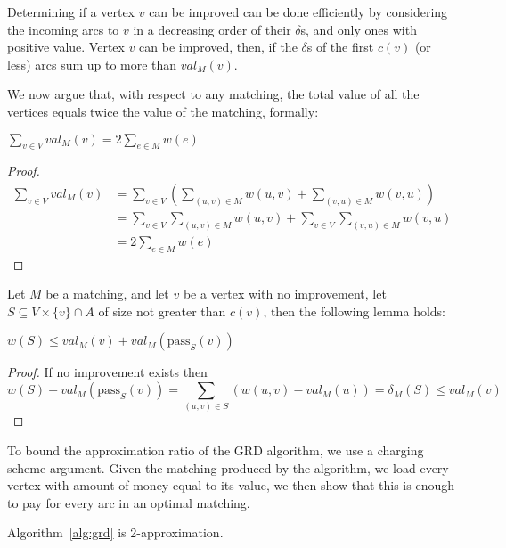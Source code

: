 \begin{remark}
Determining if a vertex $v$ can be improved can be done efficiently
by considering the incoming arcs to $v$ in a decreasing order of their $\delta$s,
and only ones with positive value.
Vertex $v$ can be improved, then, if the $\delta$s of the first $c(v)$ (or less) arcs
sum up to more than $val_M(v)$.
\end{remark}

We now argue that, with respect to any matching, 
the total value of all the vertices equals twice the value of the matching, 
formally: 
\begin{lemma}
\label{lm:val-twice}
$\sum_{v \in V} val_M(v) = 2 \sum_{e \in M} w(e)$
\end{lemma}

\begin{proof}
\begin{equation}
\begin{split}
\sum_{v \in V} val_M(v)	& = 
\sum_{v \in V} \left( \sum_{(u, v) \in M} w(u, v) + \sum_{(v, u) \in M} w(v, u) \right)	\\
						& = \sum_{v \in V}\sum_{(u, v) \in M} w(u, v) + 
							\sum_{v \in V}\sum_{(v, u) \in M} w(v, u)					\\
						& = 2 \sum_{e \in M} w(e)
\end{split}
\end{equation}
\end{proof}

Let $M$ be a matching, and let $v$ be a vertex with no improvement,
let $S \subseteq V \times \{v\} \cap A$ of size not greater than $c(v)$,
then the following lemma holds:

\begin{lemma}
\label{lm:no improve}
$w(S) \leq val_M(v) + val_M(\text{pass}_S(v))$
\end{lemma}

\begin{proof}
If no improvement exists then
$$
w(S) - val_M(\text{pass}_S(v))=
\sum_{(u,v) \in S}(w(u,v) - val_M(u)) =
\delta_M(S) 
\leq val_M(v)
$$
\end{proof}

To bound the approximation ratio of the GRD algorithm, 
we use a charging scheme argument.
Given the matching produced by the algorithm, 
we load every vertex with amount of money equal to its value,
we then show that this is enough to pay for every arc in an optimal matching.   

\begin{theorem}
Algorithm~\ref{alg:grd} is 2-approximation.
\end{theorem}

